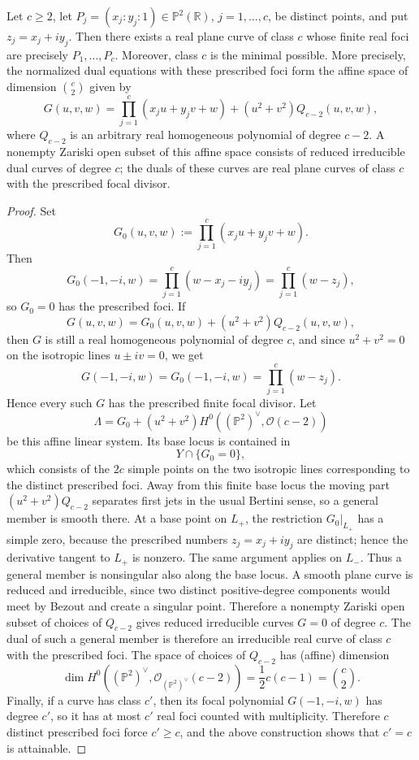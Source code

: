 \documentclass[10pt,a4paper]{amsart}
\newcommand{\bP}{\mathbb{P}}
\newcommand{\bR}{\mathbb{R}}
\begin{document}
\begin{prop}
Let $c\ge 2$, let $P_j=(x_j:y_j:1)\in \bP^2(\bR)$, $j=1,\dots,c$, be distinct points, and put $z_j=x_j+iy_j$. Then there exists a real plane curve of class $c$ whose finite real foci are precisely $P_1,\dots,P_c$. Moreover, class $c$ is the minimal possible. More precisely, the normalized dual equations with these prescribed foci form the affine space of dimension $\binom{c}{2}$ given by
\[
G(u,v,w)=\prod_{j=1}^c (x_ju+y_jv+w)+(u^2+v^2)Q_{c-2}(u,v,w),
\]
where $Q_{c-2}$ is an arbitrary real homogeneous polynomial of degree $c-2$. A nonempty Zariski open subset of this affine space consists of reduced irreducible dual curves of degree $c$; the duals of these curves are real plane curves of class $c$ with the prescribed focal divisor.
\end{prop}

\begin{proof}
Set
\[
G_0(u,v,w):=\prod_{j=1}^c (x_ju+y_jv+w).
\]
Then
\[
G_0(-1,-i,w)=\prod_{j=1}^c(w-x_j-iy_j)=\prod_{j=1}^c(w-z_j),
\]
so $G_0=0$ has the prescribed foci. If
\[
G(u,v,w)=G_0(u,v,w)+(u^2+v^2)Q_{c-2}(u,v,w),
\]
then $G$ is still a real homogeneous polynomial of degree $c$, and since $u^2+v^2=0$ on the isotropic lines $u \pm iv=0$, we get
\[
G(-1,-i,w)=G_0(-1,-i,w)=\prod_{j=1}^c(w-z_j).
\]
Hence every such $G$ has the prescribed finite focal divisor. Let
\[
\Lambda=G_0+(u^2+v^2)H^0((\mathbb P^2)^\vee,\mathcal O(c-2))
\]
be this affine linear system. Its base locus is contained in
\[
Y\cap\{G_0=0\},
\]
which consists of the $2c$ simple points on the two isotropic lines corresponding to the distinct prescribed foci. Away from this finite base locus the moving part $(u^2+v^2)Q_{c-2}$ separates first jets in the usual Bertini sense, so a general member is smooth there. At a base point on $L_+$, the restriction $G_0|_{L_+}$ has a simple zero, because the prescribed numbers $z_j=x_j+iy_j$ are distinct; hence the derivative tangent to $L_+$ is nonzero. The same argument applies on $L_-$. Thus a general member is nonsingular also along the base locus. A smooth plane curve is reduced and irreducible, since two distinct positive-degree components would meet by Bezout and create a singular point. Therefore a nonempty Zariski open subset of choices of $Q_{c-2}$ gives reduced irreducible curves $G=0$ of degree $c$.  The dual of such a general member is therefore an irreducible real curve of class $c$ with the prescribed foci. The space of choices of $Q_{c-2}$ has (affine) dimension
\[
\dim H^0((\mathbb P^2)^\vee,\mathcal O_{(\mathbb P^2)^\vee}(c-2))=\frac{1}2 c(c-1)=\binom{c}2.
\]
Finally, if a curve has class $c'$, then its focal polynomial $G(-1,-i,w)$ has degree $c'$, so it has at most $c'$ real foci counted with multiplicity. Therefore $c$ distinct prescribed foci force $c'\ge c$, and the above construction shows that $c'=c$ is attainable.
\end{proof}
\end{document}
